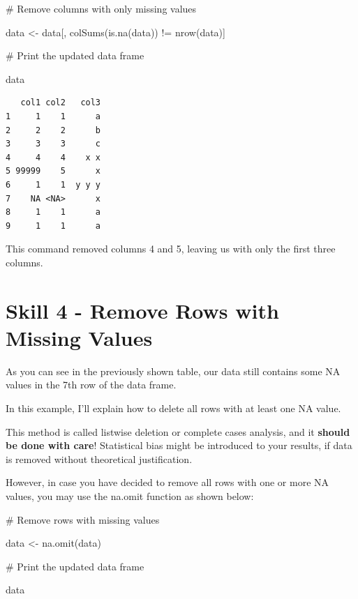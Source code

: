 \documentclass[
  letterpaper,
  DIV=11,
  numbers=noendperiod]{scrreprt}
\newenvironment{Shaded}{\begin{snugshade}}{\end{snugshade}}
\newcommand{\CommentTok}[1]{\textcolor[rgb]{0.37,0.37,0.37}{#1}}
\newcommand{\FunctionTok}[1]{\textcolor[rgb]{0.28,0.35,0.67}{#1}}
\newcommand{\NormalTok}[1]{\textcolor[rgb]{0.00,0.23,0.31}{#1}}
\newcommand{\OtherTok}[1]{\textcolor[rgb]{0.00,0.23,0.31}{#1}}
\newcommand{\SpecialCharTok}[1]{\textcolor[rgb]{0.37,0.37,0.37}{#1}}
\begin{document}
\begin{Shaded}
\begin{Highlighting}[]
\CommentTok{\# Remove columns with only missing values}

\NormalTok{data }\OtherTok{\textless{}{-}}\NormalTok{ data[, }\FunctionTok{colSums}\NormalTok{(}\FunctionTok{is.na}\NormalTok{(data)) }\SpecialCharTok{!=} \FunctionTok{nrow}\NormalTok{(data)]}

\CommentTok{\# Print the updated data frame}

\NormalTok{data}
\end{Highlighting}
\end{Shaded}

\begin{verbatim}
   col1 col2   col3
1     1    1      a
2     2    2      b
3     3    3      c
4     4    4    x x
5 99999    5      x
6     1    1  y y y
7    NA <NA>      x
8     1    1      a
9     1    1      a
\end{verbatim}

This command removed columns 4 and 5, leaving us with only the first
three columns.

\section*{Skill 4 - Remove Rows with Missing
Values}\label{skill-4---remove-rows-with-missing-values}


As you can see in the previously shown table, our data still contains
some NA values in the 7th row of the data frame.

In this example, I'll explain how to delete all rows with at least one
NA value.

This method is called listwise deletion or complete cases analysis, and
it \textbf{should be done with care}! Statistical bias might be
introduced to your results, if data is removed without theoretical
justification.

However, in case you have decided to remove all rows with one or more NA
values, you may use the na.omit function as shown below:

\begin{Shaded}
\begin{Highlighting}[]
\CommentTok{\# Remove rows with missing values}

\NormalTok{data }\OtherTok{\textless{}{-}} \FunctionTok{na.omit}\NormalTok{(data)}

\CommentTok{\# Print the updated data frame}

\NormalTok{data}
\end{Highlighting}
\end{Shaded}
\end{document}
